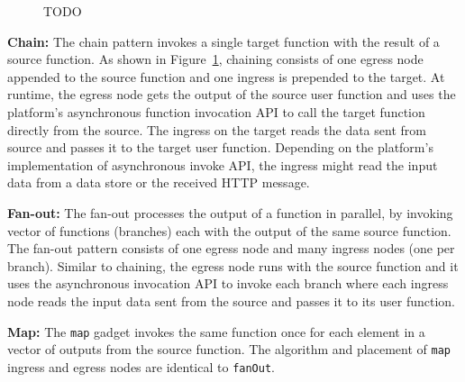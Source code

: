 \begin{figure}[t!]
	\centering
	\caption{TODO}
	\label{fig:transition}
\end{figure}

\noindent\textbf{Chain:}
The chain pattern invokes a single target function with the result of a source function.
As shown in Figure~\ref{fig:transition}, chaining consists of one egress node 
appended to the source function and one ingress is prepended to the target.
At runtime, the egress node gets the output of the source user function
and uses the platform's asynchronous function invocation API to call the
target function directly from the source. The ingress on the target reads the
data sent from source and passes it to the target user function. Depending on
the platform's implementation of asynchronous invoke API, the ingress might
read the input data from a data store or the received HTTP message.


\noindent\textbf{Fan-out:}
The fan-out processes the output of a function  in parallel, by 
invoking vector of functions (branches) each with the output of the same
source function. The fan-out pattern consists of one egress node and many ingress
nodes (one per branch). Similar to chaining, the egress node runs with the
source function and it uses the asynchronous invocation API to invoke each
branch where each ingress node 
reads the input data sent from the source and passes it to its user function.


\noindent \textbf{Map:}
The \texttt{map} gadget invokes the same
function once for each element in a vector of outputs from the source
function. The algorithm and placement of \texttt{map} ingress and egress nodes
are identical to \texttt{fanOut}. 




